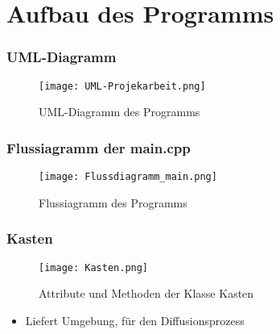 \documentclass{beamer}
\begin{document}
\section{Aufbau des Programms}

\begin{frame} %
  \frametitle{UML-Diagramm} %
  \begin{figure}[htb]
		\centering
		\texttt{[image: UML-Projekarbeit.png]}
		\caption{UML-Diagramm des Programms}
  \end{figure}
\end{frame}

\begin{frame} %
  \frametitle{Flussiagramm der main.cpp} %
  \begin{figure}[htb]
		\centering
		\texttt{[image: Flussdiagramm\_main.png]}
		\caption{Flussiagramm des Programms}
  \end{figure}
\end{frame}

\begin{frame} %
  \frametitle{Kasten} %
  \begin{figure}
		\centering
		\texttt{[image: Kasten.png]}
		\caption{Attribute und Methoden der Klasse Kasten}
  \end{figure}
  \begin{itemize}
  	\item Liefert Umgebung, für den Diffusionsprozess
  \end{itemize}
\end{frame}
\end{document}
